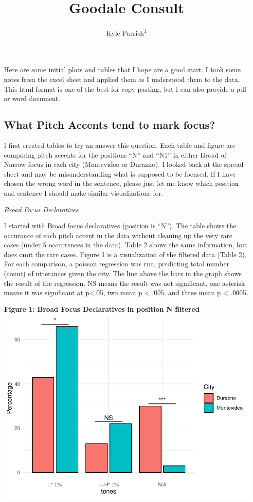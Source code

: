 \documentclass[
  man]{apa6}
\title{Goodale Consult}
\author{Kyle Parrish\textsuperscript{1}}
\date{}
\affiliation{\phantom{0}}
\begin{document}
\maketitle

Here are some initial plots and tables that I hope are a good start. I took some notes from the excel sheet and applied them as I understood them to the data. This html format is one of the best for copy-pasting, but I can also provide a pdf or word document.

\hypertarget{what-pitch-accents-tend-to-mark-focus}{%
\subsection{What Pitch Accents tend to mark focus?}\label{what-pitch-accents-tend-to-mark-focus}}

I first created tables to try an answer this question. Each table and figure are comparing pitch accents for the positions ``N'' and ``N1'' in either Broad of Narrow focus in each city (Montevideo or Durazno). I looked back at the spread sheet and may be misunderstanding what is supposed to be focused. If I have chosen the wrong word in the sentence, please just let me know which position and sentence I should make similar visualizations for.

\emph{Broad Focus Declaratives}

I started with Broad focus declaratives (position is ``N''). The table shows the occurance of each pitch accent in the data without cleaning up the very rare cases (under 5 occurrences in the data). Table 2 shows the same information, but does omit the rare cases. Figure 1 is a visualization of the filtered data (Table 2). For each comparison, a poisson regression was run, predicting total number (count) of utterances given the city. The line above the bars in the graph shows the result of the regression. NS means the result was not significant, one asterisk means it was significant at p\textless.05, two mean p \textless{} .005, and three mean p \textless{} .0005.

\textbf{Figure 1: Broad Focus Declaratives in position N filtered}
\includegraphics{main_files/figure-latex/unnamed-chunk-3-1.pdf}
\end{document}
